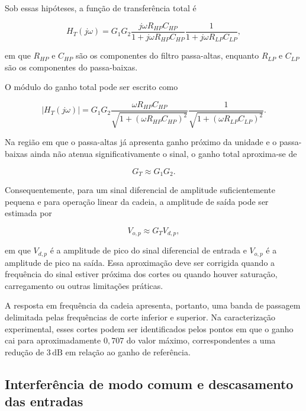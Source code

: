 \documentclass[11pt,a4paper]{article}
\begin{document}
Sob essas hipóteses, a função de transferência total é

\begin{equation}
H_T(j\omega)
=
G_1G_2
\frac{j\omega R_{HP}C_{HP}}
{1+j\omega R_{HP}C_{HP}}
\frac{1}{1+j\omega R_{LP}C_{LP}},
\label{eq:funcao_transferencia_total}
\end{equation}

em que $R_{HP}$ e $C_{HP}$ são os componentes do filtro passa-altas, enquanto $R_{LP}$ e $C_{LP}$ são os componentes do passa-baixas.

O módulo do ganho total pode ser escrito como

\begin{equation}
|H_T(j\omega)|
=
G_1G_2
\frac{\omega R_{HP}C_{HP}}
{\sqrt{1+(\omega R_{HP}C_{HP})^2}}
\frac{1}
{\sqrt{1+(\omega R_{LP}C_{LP})^2}}.
\label{eq:ganho_total_modulo}
\end{equation}

Na região em que o passa-altas já apresenta ganho próximo da unidade e o passa-baixas ainda não atenua significativamente o sinal, o ganho total aproxima-se de

\begin{equation}
G_T\approx G_1G_2.
\label{eq:ganho_total}
\end{equation}

Consequentemente, para um sinal diferencial de amplitude suficientemente pequena e para operação linear da cadeia, a amplitude de saída pode ser estimada por

\begin{equation}
V_{o,p}\approx G_TV_{d,p},
\label{eq:amplitude_saida}
\end{equation}

em que $V_{d,p}$ é a amplitude de pico do sinal diferencial de entrada e $V_{o,p}$ é a amplitude de pico na saída. Essa aproximação deve ser corrigida quando a frequência do sinal estiver próxima dos cortes ou quando houver saturação, carregamento ou outras limitações práticas.

A resposta em frequência da cadeia apresenta, portanto, uma banda de passagem delimitada pelas frequências de corte inferior e superior. Na caracterização experimental, esses cortes podem ser identificados pelos pontos em que o ganho cai para aproximadamente $0{,}707$ do valor máximo, correspondentes a uma redução de $3\,\mathrm{dB}$ em relação ao ganho de referência.

\subsection{Interferência de modo comum e descasamento das entradas}
\end{document}
